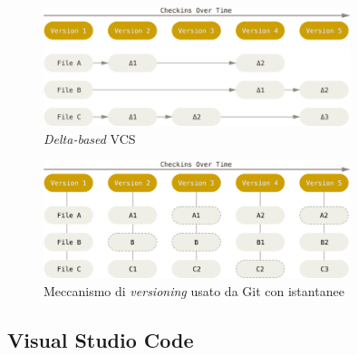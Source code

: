 \begin{figure}
    \centering
    \includegraphics[width=0.8\textwidth]{img/deltasVCS.png}
    \caption{\textit{Delta-based} VCS}
    \label{fig:deltaVCS}
\end{figure}
\begin{figure}
    \centering
    \includegraphics[width=0.8\textwidth]{img/snapshotsVCS.png}
    \caption{Meccanismo di \textit{versioning} usato da Git con istantanee}
    \label{fig:snapshotVCS}
\end{figure}
%
\subsection{Visual Studio Code}
